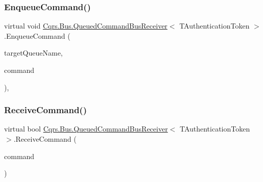 \mbox{\label{classCqrs_1_1Bus_1_1QueuedCommandBusReceiver_ab27ff7119814cdc22bf9a5811340e4e7_ab27ff7119814cdc22bf9a5811340e4e7}} 
\subsubsection{\texorpdfstring{Enqueue\+Command()}{EnqueueCommand()}}
{\footnotesize\ttfamily virtual void \hyperlink{classCqrs_1_1Bus_1_1QueuedCommandBusReceiver}{Cqrs.\+Bus.\+Queued\+Command\+Bus\+Receiver}$<$ T\+Authentication\+Token $>$.Enqueue\+Command (\begin{DoxyParamCaption}\item[{string}]{target\+Queue\+Name,  }\item[{\hyperlink{interfaceCqrs_1_1Commands_1_1ICommand}{I\+Command}$<$ T\+Authentication\+Token $>$}]{command }\end{DoxyParamCaption})\hspace{0.3cm}{\ttfamily [protected]}, {\ttfamily [virtual]}}

\mbox{\label{classCqrs_1_1Bus_1_1QueuedCommandBusReceiver_aad9ab381afcc8346479ab9cabdf1046a_aad9ab381afcc8346479ab9cabdf1046a}} 
\subsubsection{\texorpdfstring{Receive\+Command()}{ReceiveCommand()}}
{\footnotesize\ttfamily virtual bool \hyperlink{classCqrs_1_1Bus_1_1QueuedCommandBusReceiver}{Cqrs.\+Bus.\+Queued\+Command\+Bus\+Receiver}$<$ T\+Authentication\+Token $>$.Receive\+Command (\begin{DoxyParamCaption}\item[{\hyperlink{interfaceCqrs_1_1Commands_1_1ICommand}{I\+Command}$<$ T\+Authentication\+Token $>$}]{command }\end{DoxyParamCaption})\hspace{0.3cm}{\ttfamily [virtual]}}

